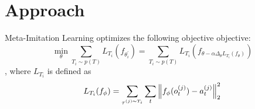 \section{Approach}

Meta-Imitation Learning optimizes the following objective objective:
$$\min_{\theta} \sum_{T_i \sim p(T)} L_{T_i}(f_{\theta_{i}^{'}}) =
\sum_{T_i \sim p(T)} L_{T_i}(f_{\theta - \alpha \Delta_{\theta}L_{T_i}(f_\theta)})$$
, where $L_{T_i}$ is defined as
$$L_{T_i}(f_\phi) = \sum_{\tau^{(j) \sim T_i}} \sum_t \left\lVert f_{\phi}(o_t^{(j)}) - a_t^{(j)}\right\rVert_2^2$$




